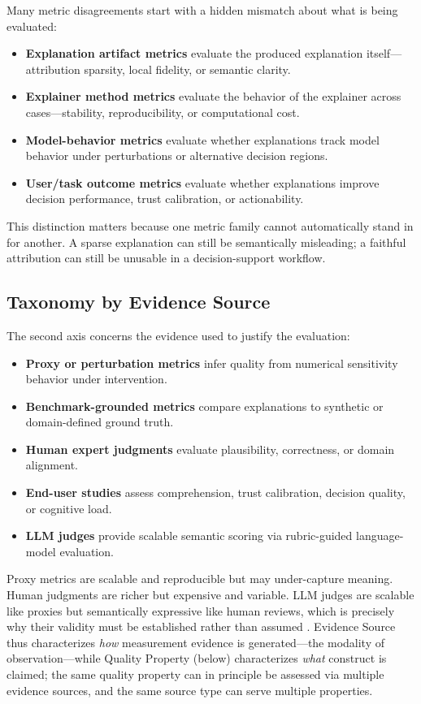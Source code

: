 \documentclass[10pt]{article}
\begin{document}
Many metric disagreements start with a hidden mismatch about what is
being evaluated:
\begin{itemize}[leftmargin=*]
\item \textbf{Explanation artifact metrics} evaluate the produced
explanation itself---attribution sparsity, local fidelity, or semantic
clarity.
\item \textbf{Explainer method metrics} evaluate the behavior of the
explainer across cases---stability, reproducibility, or computational
cost.
\item \textbf{Model-behavior metrics} evaluate whether explanations track
model behavior under perturbations or alternative decision regions.
\item \textbf{User/task outcome metrics} evaluate whether explanations
improve decision performance, trust calibration, or actionability.
\end{itemize}

This distinction matters because one metric family cannot automatically
stand in for another. A sparse explanation can still be semantically
misleading; a faithful attribution can still be unusable in a
decision-support workflow.

\subsection{Taxonomy by Evidence Source}

The second axis concerns the evidence used to justify the evaluation:
\begin{itemize}[leftmargin=*]
\item \textbf{Proxy or perturbation metrics} infer quality from numerical
sensitivity behavior under intervention.
\item \textbf{Benchmark-grounded metrics} compare explanations to
synthetic or domain-defined ground truth.
\item \textbf{Human expert judgments} evaluate plausibility, correctness,
or domain alignment.
\item \textbf{End-user studies} assess comprehension, trust calibration,
decision quality, or cognitive load.
\item \textbf{LLM judges} provide scalable semantic scoring via
rubric-guided language-model evaluation.
\end{itemize}

Proxy metrics are scalable and reproducible but may under-capture meaning.
Human judgments are richer but expensive and variable. LLM judges are
scalable like proxies but semantically expressive like human reviews,
which is precisely why their validity must be established rather than
assumed \citep{gu2024llmjudge,wu2025userperceptions,zhou2025medthink}.
Evidence Source thus characterizes \emph{how} measurement evidence is generated---the modality of observation---while Quality Property (below) characterizes \emph{what} construct is claimed; the same quality property can in principle be assessed via multiple evidence sources, and the same source type can serve multiple properties.
\end{document}
